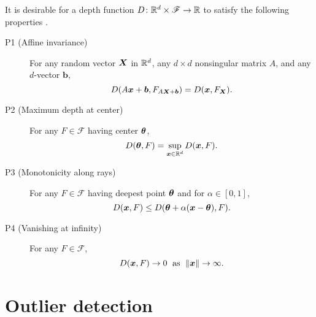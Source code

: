
It is desirable for a depth function $D\colon \mathbb{R}^d \times \mathscr{F} \to \mathbb{R}$
to satisfy the following properties \cite{zuo-serfling-2000}.
\begin{description}
    \item[P1 (Affine invariance)] For any random vector $\bm{X}$ in $\mathbb{R}^d$, any
    $d \times d$ nonsingular matrix $A$, and any $d$-vector $\bm{b}$,
    \begin{equation}
        D(A\bm{x} + \bm{b}, F_{A\bm{X} + \bm{b}}) = D(\bm{x}, F_{\bm{X}}).
    \end{equation}

    \item[P2 (Maximum depth at center)] For any $F \in \mathscr{F}$ having
    center $\bm{\theta}$,
    \begin{equation}
        D(\bm{\theta}, F) = \sup_{\bm{x} \in \mathbb{R}^d} D(\bm{x}, F).
    \end{equation}

    \item[P3 (Monotonicity along rays)] For any $F \in \mathscr{F}$ having
    deepest point $\bm{\theta}$ and for $\alpha \in [0, 1]$,
    \begin{equation}
        D(\bm{x}, F) \leq D(\bm{\theta} + \alpha(\bm{x} - \bm{\theta}), F).
    \end{equation}

    \item[P4 (Vanishing at infinity)] For any $F \in \mathscr{F}$,
    \begin{equation}
        D(\bm{x}, F) \to 0 \;\text{ as }\;\Vert \bm{x} \Vert \to \infty.
    \end{equation}
\end{description}












\section{Outlier detection}
